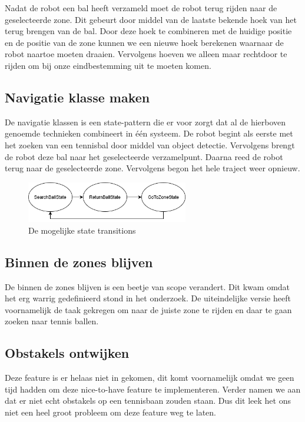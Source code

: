 Nadat de robot een bal heeft verzameld moet de robot terug rijden naar de geselecteerde zone. Dit gebeurt door middel van de laatste bekende hoek van het terug brengen van de bal. Door deze hoek te combineren met de huidige positie en de positie van de zone kunnen we een nieuwe hoek berekenen waarnaar de robot naartoe moeten draaien. Vervolgens hoeven we alleen maar rechtdoor te rijden om bij onze eindbestemming uit te moeten komen.

\subsection{Navigatie klasse maken}
De navigatie klassen is een state-pattern die er voor zorgt dat al de hierboven genoemde technieken combineert in één systeem. De robot begint als eerste met het zoeken van een tennisbal door middel van object detectie. Vervolgens brengt de robot deze bal naar het geselecteerde verzamelpunt. Daarna reed de robot terug naar de geselecteerde zone. Vervolgens begon het hele traject weer opnieuw.

\begin{figure}[H]
    \centering
    \includegraphics[width=200pt]{img/state_pattern.png}
    \caption{De mogelijke state transitions}
    \label{fig:state_pattern}
\end{figure}

\subsection{Binnen de zones blijven}
De binnen de zones blijven is een beetje van scope verandert. Dit kwam omdat het erg warrig gedefinieerd stond in het onderzoek. De uiteindelijke versie heeft voornamelijk de taak gekregen om naar de juiste zone te rijden en daar te gaan zoeken naar tennis ballen.

\subsection{Obstakels ontwijken}
Deze feature is er helaas niet in gekomen, dit komt voornamelijk omdat we geen tijd hadden om deze nice-to-have feature te implementeren. Verder namen we aan dat er niet echt  obstakels op een tennisbaan zouden staan. Dus dit leek het ons niet een heel groot probleem om deze feature weg te laten.
